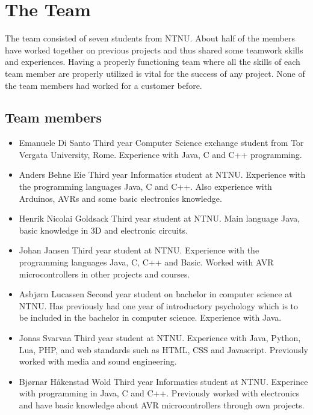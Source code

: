 
\section{The Team}
The team consisted of seven students from NTNU. About half of the members have worked
together on previous projects and thus shared some teamwork skills and experiences.
Having a properly functioning team where all the skills of each team member are properly
utilized is vital for the success of any project. None of the team members had 
worked for a customer before.

\subsection{Team members}

\begin{itemize}
\item{Emanuele Di Santo}\newline
Third year Computer Science exchange student from Tor Vergata University, Rome.
Experience with Java, C and C++ programming.

\item{Anders Behne Eie}\newline
Third year Informatics student at NTNU. Experience with the programming languages Java,
C and C++. Also experience with Arduinos, AVRs and some basic electronics knowledge.

\item{Henrik Nicolai Goldsack}\newline
Third year student at NTNU. Main language Java, basic knowledge in 3D and electronic circuits.

\item{Johan Jansen}\newline
Third year student at NTNU. Experience with the programming languages Java, C, C++  and
Basic. Worked with AVR microcontrollers in other projects and courses.

\item{Asbjørn Lucassen}\newline
Second year student on bachelor in computer science at NTNU. Has previously had one year of
introductory psychology which is to be included in the bachelor in computer science.
Experience with Java.

\item{Jonas Svarvaa}\newline
Third year student at NTNU. Experience with Java, Python, Lua, PHP, and web standards such as HTML,
CSS and Javascript. Previously worked with media and sound engineering.

\item{Bjørnar Håkenstad Wold}\newline
Third year Informatics student at NTNU. Experince with programming in Java, C and C++.
Previously worked with electronics and have basic knowledge about AVR microcontrollers through
own projects.
\end{itemize}

